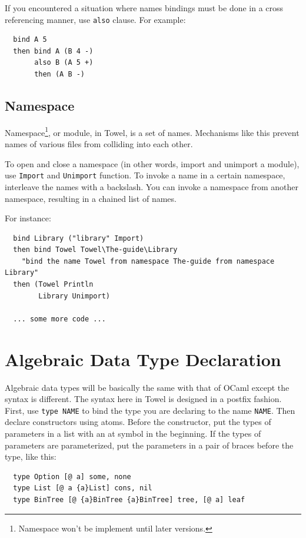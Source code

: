 \documentclass{book}
\begin{document}
If you encountered a situation where names bindings must be done in a cross referencing manner, use \texttt{also} clause. For example:
\begin{verbatim}
  bind A 5
  then bind A (B 4 -)
       also B (A 5 +)
       then (A B -)
\end{verbatim}

\subsection{Namespace}

Namespace\footnote{Namespace won't be implement until later versions.}, or module, in Towel, is a set of names. Mechanisms like this prevent names of various files from colliding into each other.

To open and close a namespace (in other words, import and unimport a module), use \texttt{Import} and \texttt{Unimport} function. To invoke a name in a certain namespace, interleave the names with a backslash. You can invoke a namespace from another namespace, resulting in a chained list of names.

For instance:
\begin{verbatim}
  bind Library ("library" Import)
  then bind Towel Towel\The-guide\Library
    "bind the name Towel from namespace The-guide from namespace Library"
  then (Towel Println
        Library Unimport)

  ... some more code ...
\end{verbatim}


\section{Algebraic Data Type Declaration}
\label{ssec:atdf}

Algebraic data types will be basically the same with that of OCaml except the syntax is different. The syntax here in Towel is designed in a postfix fashion. First, use \texttt{type NAME} to bind the type you are declaring to the name \texttt{NAME}. Then declare constructors using atoms. Before the constructor, put the types of parameters in a list with an at symbol in the beginning. If the types of parameters are parameterized, put the parameters in a pair of braces before the type, like this:
\begin{verbatim}
  type Option [@ a] some, none
  type List [@ a {a}List] cons, nil
  type BinTree [@ {a}BinTree {a}BinTree] tree, [@ a] leaf
\end{verbatim}
\end{document}
